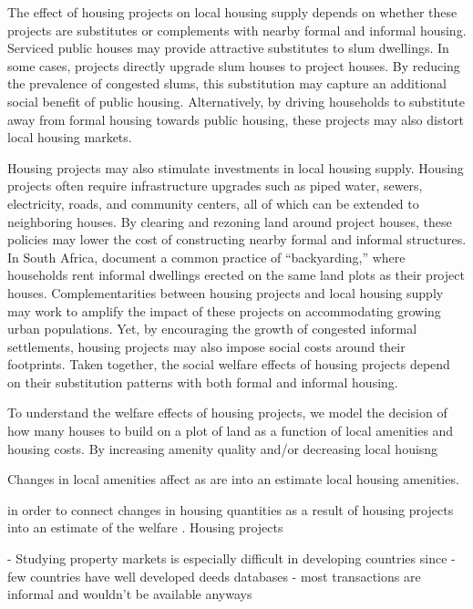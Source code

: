 \documentclass[12pt]{article}
\begin{document}
The effect of housing projects on local housing supply depends on whether these projects are substitutes or complements with nearby formal and informal housing.  Serviced public houses may provide attractive substitutes to slum dwellings.  In some cases, projects directly upgrade slum houses to project houses.  By reducing the prevalence of congested slums, this substitution may capture an additional social benefit of public housing.  Alternatively, by driving households to substitute away from formal housing towards public housing, these projects may also distort local housing markets.

Housing projects may also stimulate investments in local housing supply.  Housing projects often require infrastructure upgrades such as piped water, sewers, electricity, roads, and community centers, all of which can be extended to neighboring houses.  By clearing and rezoning land around project houses, these policies may lower the cost of constructing nearby formal and informal structures.  In South Africa, \cite{Brueckner2018backyarding} document a common practice of ``backyarding,'' where households rent informal dwellings erected on the same land plots as their project houses.  Complementarities between housing projects and local housing supply may work to amplify the impact of these projects on accommodating growing urban populations.  Yet, by encouraging the growth of congested informal settlements, housing projects may also impose social costs around their footprints.  Taken together, the social welfare effects of housing projects depend on their substitution patterns with both formal and informal housing.


To understand the welfare effects of housing projects, we model the decision of how many houses to build on a plot of land as a function of local amenities and housing costs.  By increasing amenity quality and/or decreasing local houisng 

Changes in local amenities affect as are into an estimate local housing amenities.  


in order to connect changes in housing quantities as a result of housing projects into an estimate of the welfare .  Housing projects 


- Studying property markets is especially difficult in developing countries since
   - few countries have well developed deeds databases
   - most transactions are informal and wouldn't be available anyways
\end{document}
